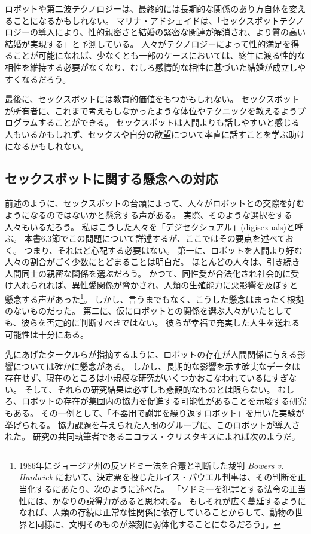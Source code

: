 \documentclass[paper=a4,book,openany]{jlreq} \usepackage{mystyle}
\begin{document}
ロボットや第二波テクノロジーは、最終的には長期的な関係のあり方自体を変えることになるかもしれない。
マリナ・アドシェイドは、「セックスボットテクノロジーの導入により、性的親密さと結婚の緊密な関連が解消され、より質の高い結婚が実現する」と予測している\citep[p.292]{adshade17:_sexbot_induc_social_chang}。
人々がテクノロジーによって性的満足を得ることが可能になれば、少なくとも一部のケースにおいては、終生に渡る性的な相性を維持する必要がなくなり、むしろ感情的な相性に基づいた結婚が成立しやすくなるだろう。

最後に、セックスボットには教育的価値をもつかもしれない。
セックスボットが所有者に、これまで考えもしなかったような体位やテクニックを教えるようプログラムすることができる。
セックスボットは人間よりも話しやすいと感じる人もいるかもしれず、セックスや自分の欲望について率直に話すことを学ぶ助けになるかもしれない。

\subsection{セックスボットに関する懸念への対応}

前述のように、セックスボットの台頭によって、人々がロボットとの交際を好むようになるのではないかと懸念する声がある。
実際、そのような選択をする人々もいるだろう。
私はこうした人々を「デジセクシュアル」(digisexuals)と呼ぶ。
本書6.3節でこの問題について詳述するが、ここではその要点を述べておく。
つまり、それほど心配する必要はない。
第一に、ロボットを人間より好む人々の割合がごく少数にとどまることは明白だ。
ほとんどの人々は、引き続き人間同士の親密な関係を選ぶだろう。
かつて、同性愛が合法化され社会的に受け入れられれば、異性愛関係が脅かされ、人類の生殖能力に悪影響を及ぼすと懸念する声があった\footnote{ 1986年にジョージア州の反ソドミー法を合憲と判断した裁判 \emph{Bowers v. Hardwick} において、決定票を投じたルイス・パウエル判事は、その判断を正当化するにあたり、次のように述べた。
「ソドミーを犯罪とする法令の正当性には、かなりの説得力があると思われる。
もしそれが広く蔓延するようになれば、人類の存続は正常な性関係に依存していることからして、動物の世界と同様に、文明そのものが深刻に弱体化することになるだろう」。}。
しかし、言うまでもなく、こうした懸念はまったく根拠のないものだった。
第二に、仮にロボットとの関係を選ぶ人々がいたとしても、彼らを否定的に判断すべきではない。
彼らが幸福で充実した人生を送れる可能性は十分にある。

先にあげたタークルらが指摘するように、ロボットの存在が人間関係に与える影響については確かに懸念がある。
しかし、長期的な影響を示す確実なデータは存在せず、現在のところは小規模な研究がいくつかおこなわれているにすぎない。
そして、それらの研究結果は必ずしも悲観的なものとは限らない。
むしろ、ロボットの存在が集団内の協力を促進する可能性があることを示唆する研究もある\citep{traeger20:_vulner_robot_posit_shape_human}。
その一例として、「不器用で謝罪を繰り返すロボット」を用いた実験が挙げられる。
協力課題を与えられた人間のグループに、このロボットが導入された。
研究の共同執筆者であるニコラス・クリスタキスによれば次のようだ。
\end{document}
